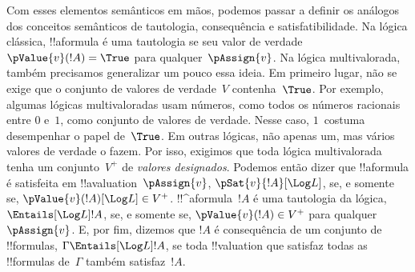 \documentclass[../../../include/open-logic-section]{subfiles}
\begin{document}
Com esses elementos semânticos em mãos, podemos passar a definir os
análogos dos conceitos semânticos de tautologia, consequência e
satisfatibilidade. Na lógica clássica, !!a{formula} é uma tautologia se
seu valor de verdade $\pValue{v}(!A) = \True$ para qualquer~$\pAssign{v}$. Na
lógica multivalorada, também precisamos generalizar um pouco essa ideia. Em primeiro
lugar, não se exige que o conjunto de valores de verdade~$V$
contenha~$\True$. Por exemplo, algumas lógicas multivaloradas usam números,
como todos os números racionais entre $0$ e~$1$, como conjunto de valores de verdade.
Nesse caso, $1$~costuma desempenhar o papel de~$\True$. Em
outras lógicas, não apenas um, mas vários valores de verdade o fazem. Por isso,
exigimos que toda lógica multivalorada tenha um conjunto~$V^+$ de
\emph{valores designados}. Podemos então dizer que !!a{formula} é
satisfeita em !!a{valuation}~$\pAssign{v}$, $\pSat{v}{!A}[\Log L]$, se, e somente se,
$\pValue{v}(!A)[\Log L] \in V^+$. !!^a{formula}~$!A$ é uma tautologia da
lógica, $\Entails[\Log L] !A$, se, e somente se, $\pValue{v}(!A) \in V^+$ para
qualquer~$\pAssign{v}$. E, por fim, dizemos que $!A$ é consequência de um conjunto
de !!{formula}s, $\Gamma \Entails[\Log L] !A$, se toda !!{valuation} que
satisfaz todas as !!{formula}s de~$\Gamma$ também satisfaz~$!A$.
\end{document}

